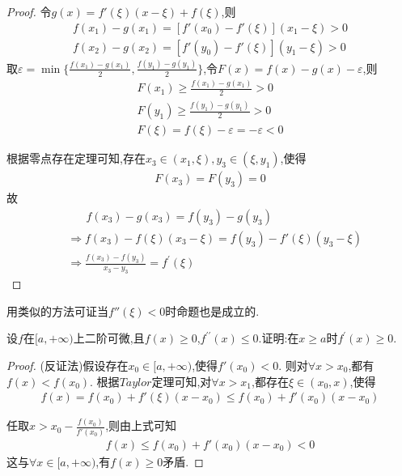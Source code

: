 \documentclass[lang=cn,newtx,10pt,scheme=chinese]{../Template/elegantbook}
\begin{document}
\begin{exercise}
\begin{proof}
    令$g(x)=f'(\xi)(x-\xi)+f(\xi)$,则
    \begin{gather}
        f(x_1)-g(x_1)=[f'(x_0)-f'(\xi)](x_1-\xi)>0
        \nonumber
        \\
        f(x_2)-g(x_2)=[f'(y_0)-f'(\xi)](y_1-\xi)>0
        \nonumber
    \end{gather}
    取$\varepsilon=\min\{\frac{f(x_1)-g(x_1)}{2},\frac{f(y_1)-g(y_1)}{2}\}$,令$F(x)=f(x)-g(x)-\varepsilon$,则
    \begin{gather}
    F(x_1)\geqslant \frac{f(x_1)-g(x_1)}{2}>0\nonumber
    \\
    F(y_1)\geqslant \frac{f(y_1)-g(y_1)}{2}>0
    \nonumber \\
    F(\xi)=f(\xi)-\varepsilon=-\varepsilon<0
        \nonumber
    \end{gather}

    根据零点存在定理可知,存在$x_3\in(x_1,\xi),y_3\in(\xi,y_1)$,使得
    \begin{gather}
    F(x_3)=F(y_3)=0
        \nonumber
    \end{gather}
    故
    \begin{equation}
        \begin{split}
        &\,\,\,\,\,\,\,\,\,\,f(x_3)-g(x_3)=f(y_3)-g(y_3)
        \nonumber
        \\
        &\Rightarrow f(x_3)-f(\xi)(x_3-\xi)=f(y_3)-f'(\xi)(y_3-\xi)
        \nonumber
        \\
        &\Rightarrow \frac{f(x_3)-f(y_3)}{x_3 - y_3}=f^{\prime}(\xi)
        \nonumber
    \end{split}
    \end{equation}
    
\end{proof}
    \begin{remark}
        用类似的方法可证当$f''(\xi)<0$时命题也是成立的.
    \end{remark}
\end{exercise}

\begin{exercise}
设\(f\)在\([a,+\infty)\)上二阶可微,且\(f(x)\geqslant 0\),\(f^{\prime\prime}(x)\leqslant 0\).证明:在\(x\geqslant  a\)时\(f^{\prime}(x)\geqslant 0\).    
    \begin{proof}
        (反证法)假设存在$x_0\in[a,+\infty)$,使得$f'(x_0)<0$.
        则对$\forall x>x_0$,都有$f(x)<f(x_0)$.
        根据$Taylor$定理可知,对$\forall x>x_1$,都存在$\xi\in(x_0,x)$,使得
        \begin{gather}
            f(x)=f(x_0)+f'(\xi)(x-x_0)\leqslant f(x_0)+f'(x_0)(x-x_0)
            \nonumber
        \end{gather}
        
        任取$x>x_0-\frac{f(x_0)}{f'(x_0)}$,则由上式可知
        \begin{gather}
            f(x)\leqslant f(x_0)+f'(x_0)(x-x_0)<0
            \nonumber
        \end{gather}
        这与$\forall x\in[a,+\infty)$,有$f(x)\geqslant 0$矛盾.
    
\end{proof}
\end{exercise}
\end{document}
